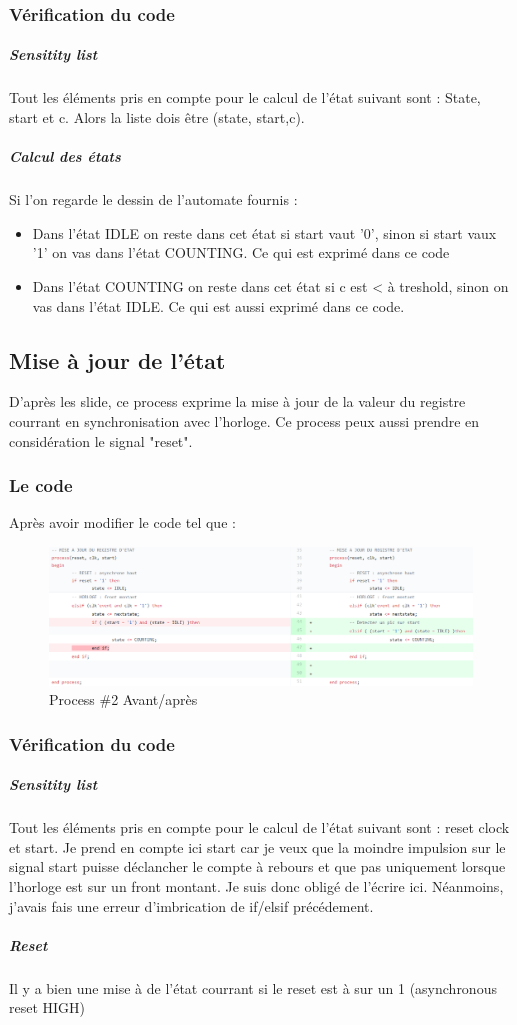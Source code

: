 \documentclass{article}
\begin{document}
\subsubsection{Vérification du code}

\subparagraph{Sensitity list}
	Tout les éléments pris en compte pour le calcul de l'état suivant sont : State, start et c. Alors la liste dois être (state, start,c).
	
\subparagraph{Calcul des états}
	Si l'on regarde le dessin de l'automate fournis : 
\begin{itemize}
\item Dans l'état IDLE on reste dans cet état si start vaut '0', sinon si start vaux '1' on vas dans l'état COUNTING. Ce qui est exprimé dans ce code
\item Dans l'état COUNTING on reste dans cet état si c est < à treshold, sinon on vas dans l'état IDLE. Ce qui est aussi exprimé dans ce code.
\end{itemize}



\newpage	

\subsection{Mise à jour de l'état}

	D'après les slide, ce process exprime la mise à jour de la valeur du registre courrant en synchronisation avec l'horloge. Ce process peux aussi prendre en considération le signal "reset".
	
\subsubsection{Le code}

Après avoir modifier le code tel que : 
\begin{figure}[!h]
\advance\leftskip-0.4cm
\includegraphics[scale=0.6]{oldProc1.PNG}
\caption{Process \#2 Avant/après }
\end{figure}

\subsubsection{Vérification du code}
\subparagraph{Sensitity list}
	Tout les éléments pris en compte pour le calcul de l'état suivant sont : reset clock et start. Je prend en compte ici start car je veux que la moindre impulsion sur le signal start puisse déclancher le compte à rebours et que pas uniquement lorsque l'horloge est sur un front montant. Je suis donc obligé de l'écrire ici.
Néanmoins, j'avais fais une erreur d'imbrication de if/elsif précédement.	
\subparagraph{Reset} Il y a bien une mise à de l'état courrant si le reset est à sur un 1 (asynchronous reset HIGH)
\end{document}
